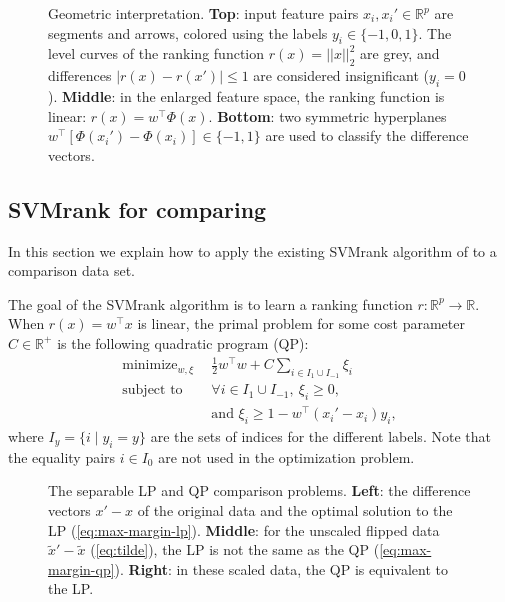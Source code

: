\documentclass{article}
\newcommand{\RR}{\mathbb R}
\DeclareMathOperator*{\minimize}{minimize}
\begin{document}
\begin{figure}
  \centering
  
  \vskip -0.5cm
  \caption{Geometric interpretation. \textbf{Top}: input feature pairs
    $x_i,x_i'\in\RR^p$ are segments and arrows, colored using the
    labels $y_i\in\{-1,0,1\}$. The level curves of the ranking
    function $r(x)=||x||_2^2$ are grey, and differences
    $|r(x)-r(x')|\leq 1$ are considered insignificant
    ($y_i=0$). \textbf{Middle}: in the enlarged feature space, the
    ranking function is linear: $r(x)=w^\intercal
    \Phi(x)$. \textbf{Bottom}: two symmetric hyperplanes
    $w^\intercal[\Phi(x_i')-\Phi(x_i)]\in\{-1,1\}$ are used to
    classify the difference vectors.}
  \label{fig:geometry}
\end{figure}

\subsection{SVMrank for comparing}
\label{sec:svmrank}
In this section we explain how to apply the existing SVMrank algorithm
of \citet{ranksvm} to a comparison data set.

The goal of the SVMrank algorithm is to learn a ranking function
$r:\RR^p \rightarrow \RR$. When $r(x)=w^\intercal x$ is linear, the
primal problem for some cost parameter $C\in\RR^+$ is the following
quadratic program (QP):
\begin{equation}
  \begin{aligned}
    \minimize_{w, \xi}\ \  & \frac 1 2 w^\intercal w 
    + C \sum_{i\in I_1\cup I_{-1}} \xi_i \\
    \text{subject to}\ \  & 
    \forall i\in I_1\cup I_{-1},\ \xi_i \geq 0,\\
&    \text{and }\xi_i \geq 1-w^\intercal(x_i'-x_i)y_i,
  \end{aligned}
  \label{eq:svmrank}
\end{equation}
where $I_y=\{i\mid y_i=y\}$ are the sets of indices for the different
labels. Note that the equality pairs $i\in I_0$ are not
used in the optimization problem.

\begin{figure*}[b!]
  \centering
  
  \vskip -1cm
  \caption{The separable LP and QP comparison problems. \textbf{Left}:
    the difference vectors $x'-x$ of the original data and the optimal
    solution to the LP (\ref{eq:max-margin-lp}). \textbf{Middle}: for
    the unscaled flipped data $\tilde x'-\tilde x$ (\ref{eq:tilde}),
    the LP is not the same as the QP
    (\ref{eq:max-margin-qp}). \textbf{Right}: in these scaled
    data, the QP is equivalent to the LP.}
  \label{fig:hard-margin}
\end{figure*}
\end{document}
